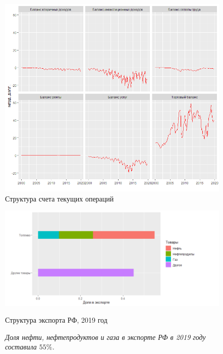 \documentclass[a4paper, 14pt]{extarticle}
\begin{document}
\begin{figure}[htp!]
	\centering
	\includegraphics[width=\linewidth]{cur_acc_comp.png}
	\captionsetup{justification=centering,margin=0.5cm}
	\caption{Структура счета текущих операций}\label{fi:structure}
\end{figure}

\newpage
\begin{figure}[htp!]
	\centering
	\includegraphics[width=18cm]{export_structure.png}
	\caption{Структура экспорта РФ, 2019 год}\label{fi:1}
	\captionsetup{justification=centering,margin=0.8cm}\label{fi:1}
	\caption*{\textit{Доля нефти, нефтепродуктов и газа в экспорте РФ в 2019 году составила $55\%$.}}
\end{figure}
\end{document}
